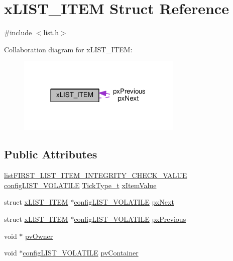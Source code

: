 \hypertarget{structx_l_i_s_t___i_t_e_m}{}\section{x\+L\+I\+S\+T\+\_\+\+I\+T\+EM Struct Reference}
\label{structx_l_i_s_t___i_t_e_m}


{\ttfamily \#include $<$list.\+h$>$}



Collaboration diagram for x\+L\+I\+S\+T\+\_\+\+I\+T\+EM\+:\nopagebreak
\begin{figure}[H]
\begin{center}
\leavevmode
\includegraphics[width=222pt]{structx_l_i_s_t___i_t_e_m__coll__graph}
\end{center}
\end{figure}
\subsection*{Public Attributes}
\begin{DoxyCompactItemize}
\item 
\hyperlink{list_8h_a3611bd5d5d87cb26ac1dc7a4852b94a0}{list\+F\+I\+R\+S\+T\+\_\+\+L\+I\+S\+T\+\_\+\+I\+T\+E\+M\+\_\+\+I\+N\+T\+E\+G\+R\+I\+T\+Y\+\_\+\+C\+H\+E\+C\+K\+\_\+\+V\+A\+L\+UE} \hyperlink{list_8h_a2d5de557c5561c8980d1bf51d87d8cba}{config\+L\+I\+S\+T\+\_\+\+V\+O\+L\+A\+T\+I\+LE} \hyperlink{portmacro_8h_aa69c48c6e902ce54f70886e6573c92a9}{Tick\+Type\+\_\+t} \hyperlink{structx_l_i_s_t___i_t_e_m_a9b1f26de79f9da1403ca3ebc7a2e653a}{x\+Item\+Value}
\item 
struct \hyperlink{structx_l_i_s_t___i_t_e_m}{x\+L\+I\+S\+T\+\_\+\+I\+T\+EM} $\ast$\hyperlink{list_8h_a2d5de557c5561c8980d1bf51d87d8cba}{config\+L\+I\+S\+T\+\_\+\+V\+O\+L\+A\+T\+I\+LE} \hyperlink{structx_l_i_s_t___i_t_e_m_a03713c4ee953ef5ca6adbec883720c60}{px\+Next}
\item 
struct \hyperlink{structx_l_i_s_t___i_t_e_m}{x\+L\+I\+S\+T\+\_\+\+I\+T\+EM} $\ast$\hyperlink{list_8h_a2d5de557c5561c8980d1bf51d87d8cba}{config\+L\+I\+S\+T\+\_\+\+V\+O\+L\+A\+T\+I\+LE} \hyperlink{structx_l_i_s_t___i_t_e_m_ae8e553eae41010a8e41c66d76c94110b}{px\+Previous}
\item 
void $\ast$ \hyperlink{structx_l_i_s_t___i_t_e_m_aeb3110b50fe0dbce826d929b27b5ddb1}{pv\+Owner}
\item 
void $\ast$\hyperlink{list_8h_a2d5de557c5561c8980d1bf51d87d8cba}{config\+L\+I\+S\+T\+\_\+\+V\+O\+L\+A\+T\+I\+LE} \hyperlink{structx_l_i_s_t___i_t_e_m_a341462d06236aa07eaf1a864e4b59951}{pv\+Container}
\end{DoxyCompactItemize}


